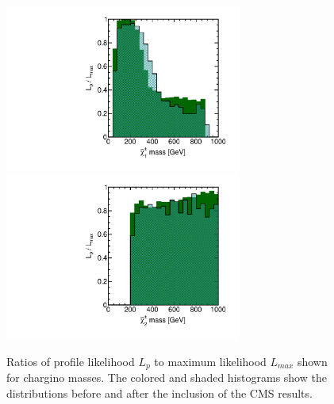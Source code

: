 \begin{figure}[htbp]
\begin{center}
\includegraphics[height=5.5cm]{figs/fig_chi_1_pm.pdf} 
\includegraphics[height=5.5cm]{figs/fig_chi_2_pm.pdf}
\caption{Ratios of profile likelihood $L_p$ to maximum likelihood $L_{max}$ shown for chargino masses.  The colored and shaded histograms show the distributions before and after the inclusion of the CMS results.}
\label{fig:LRwcms_chipm}
\end{center}
\end{figure}



